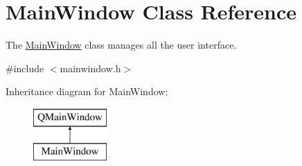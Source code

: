 \hypertarget{classMainWindow}{\section{Main\-Window Class Reference}
\label{classMainWindow}
}


The \hyperlink{classMainWindow}{Main\-Window} class manages all the user interface.  




{\ttfamily \#include $<$mainwindow.\-h$>$}

Inheritance diagram for Main\-Window\-:\begin{figure}[H]
\begin{center}
\leavevmode
\includegraphics[height=2.000000cm]{classMainWindow}
\end{center}
\end{figure}
